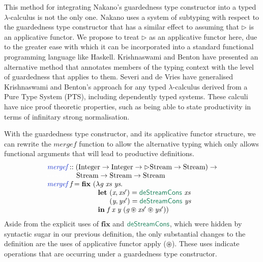 \documentclass[natbib]{sigplanconf}
\newcommand{\elim}[1]{\textcolor{elim}{\textsf{#1}}}
\newcommand{\kw}[1]{\textbf{#1}}
\newcommand{\tyname}[1]{\textrm{#1}}
\newcommand{\ident}[1]{\textit{#1}}
\newcommand{\defn}[1]{\textcolor{defnd}{\ident{#1}}}
\begin{document}
This method for integrating Nakano's guardedness type constructor into
a typed $\lambda$-calculus is not the only one.  Nakano uses a system
of subtyping with respect to the guardedness type constructor that has
a similar effect to assuming that $\rhd$ is an applicative functor. We
propose to treat $\rhd$ as an applicative functor here, due to the greater
ease with which it can be incorporated into a standard functional
programming language like Haskell. Krishnaswami and Benton
\cite{krishnaswami11semantic,krishnaswami11ultrametric} have presented
an alternative method that annotates members of the typing context
with the level of guardedness that applies to them. Severi and de
Vries \cite{severi12pure} have generalised Krishnaswami and Benton's
approach for any typed $\lambda$-calculus derived from a Pure Type
System (PTS), including dependently typed systems. These calculi have
nice proof theoretic properties, such as being able to state
productivity in terms of infinitary strong normalisation.

With the guardedness type constructor, and its applicative functor
structure, we can rewrite the $\ident{mergef}$ function to allow the
alternative typing which only allows functional arguments that will
lead to productive definitions.
\begin{displaymath}
  \begin{array}{l}
    \defn{mergef} :: (\tyname{Integer} \to \tyname{Integer} \to \rhd\tyname{Stream} \to \tyname{Stream}) \to \\
    \textcolor{white}{\textrm{mergef} :: }\ \tyname{Stream} \to \tyname{Stream} \to \tyname{Stream} \\
    \defn{mergef}\ \ident{f} = \kw{fix}\ (\lambda \ident{g}\ \ident{xs}\ \ident{ys}. \\
    \hspace{2.5cm} \kw{let}\ (\ident{x}, \ident{xs$'$}) = \elim{deStreamCons}\ \ident{xs} \\
    \hspace{2.5cm} \textcolor{white}{\kw{let}\ }(\ident{y}, \ident{ys$'$}) = \elim{deStreamCons}\ \ident{ys} \\
    \hspace{2.5cm} \kw{in}\ \ident{f}\ \ident{x}\ \ident{y}\ (\ident{g} \circledast \ident{xs$'$} \circledast \ident{ys$'$}))
  \end{array}
\end{displaymath}
Aside from the explicit uses of $\kw{fix}$ and $\elim{deStreamCons}$,
which were hidden by syntactic sugar in our previous definition, the
only substantial changes to the definition are the uses of applicative
functor apply ($\circledast$). These uses indicate operations that are
occurring under a guardedness type constructor.
\end{document}
